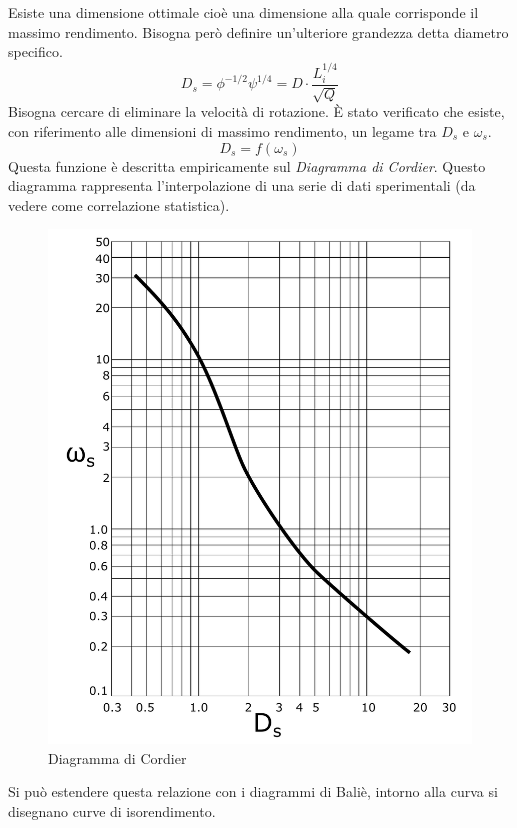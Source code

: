 Esiste una dimensione ottimale cioè una dimensione alla quale corrisponde il massimo rendimento. Bisogna però definire un’ulteriore grandezza detta diametro specifico.
\begin{equation}
D_s= \phi^{-1/2} \psi^{1/4} = D \cdot \frac{L_i^{1/4}}{\sqrt{Q}}
\end{equation}
Bisogna cercare di eliminare la velocità di rotazione. È stato verificato che esiste, con riferimento alle dimensioni di massimo rendimento, un legame tra $D_s$ e $\omega_s$. 
\begin{equation}
D_s=f(\omega_s)
\end{equation}
Questa funzione è descritta empiricamente sul \textit{Diagramma di Cordier}. Questo diagramma rappresenta l’interpolazione di una serie di dati sperimentali (da vedere come correlazione statistica).
\begin{figure}
\centering
  \includegraphics[width=.3\textwidth]{fig/cord_diag.pdf}
\caption{Diagramma di Cordier}
\label{fig:cord}
\end{figure}
Si può estendere questa relazione con i diagrammi di Baliè, intorno alla curva si disegnano curve di isorendimento.
